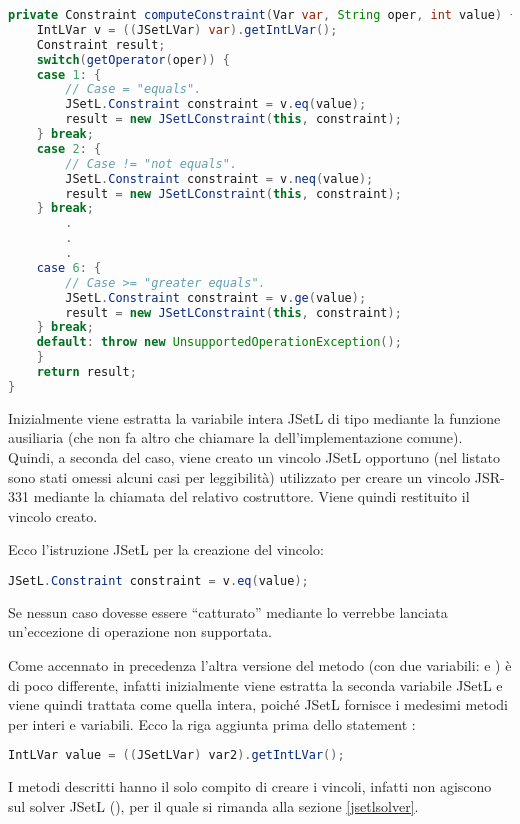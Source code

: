 \begin{lstlisting}[language = Java,
                   caption = {\files{computeConstraint}.}]
private Constraint computeConstraint(Var var, String oper, int value) {
	IntLVar v = ((JSetLVar) var).getIntLVar();
	Constraint result;
	switch(getOperator(oper)) {
	case 1: {
		// Case = "equals".
		JSetL.Constraint constraint = v.eq(value);
		result = new JSetLConstraint(this, constraint);
	} break;
	case 2: {
		// Case != "not equals".
		JSetL.Constraint constraint = v.neq(value);
		result = new JSetLConstraint(this, constraint);
	} break;
        .
        .
        .
	case 6: {
		// Case >= "greater equals".
		JSetL.Constraint constraint = v.ge(value);
		result = new JSetLConstraint(this, constraint);
	} break;
	default: throw new UnsupportedOperationException();
	}
	return result;
}
\end{lstlisting}
Inizialmente viene estratta la variabile intera JSetL di tipo 
 mediante la funzione ausiliaria  (che non
fa altro che chiamare la  dell'implementazione comune).
Quindi, a seconda del caso, viene creato un vincolo JSetL opportuno (nel listato
sono stati omessi alcuni casi per leggibilità) utilizzato per creare un vincolo
JSR-331 mediante la chiamata del relativo costruttore. Viene quindi
restituito il vincolo creato.

Ecco l'istruzione JSetL per la creazione del vincolo:
\begin{lstlisting}[language = Java, frame = single]
JSetL.Constraint constraint = v.eq(value);
\end{lstlisting}


Se nessun caso dovesse essere ``catturato'' mediante lo  
verrebbe lanciata un'eccezione di operazione non supportata.

Come accennato in precedenza l'altra versione del metodo (con due variabili:
 e ) è di poco differente, infatti inizialmente
viene estratta la seconda variabile JSetL e viene quindi trattata come
quella intera, poiché JSetL fornisce i medesimi metodi per interi e variabili.
Ecco la riga aggiunta prima dello statement :
\begin{lstlisting}[language = Java, frame = single]
IntLVar value = ((JSetLVar) var2).getIntLVar();
\end{lstlisting}
\begin{nota}
I metodi descritti hanno il solo compito di creare i vincoli, infatti non
agiscono sul solver JSetL (), per il quale si rimanda
alla sezione \ref{jsetlsolver}.
\end{nota}

